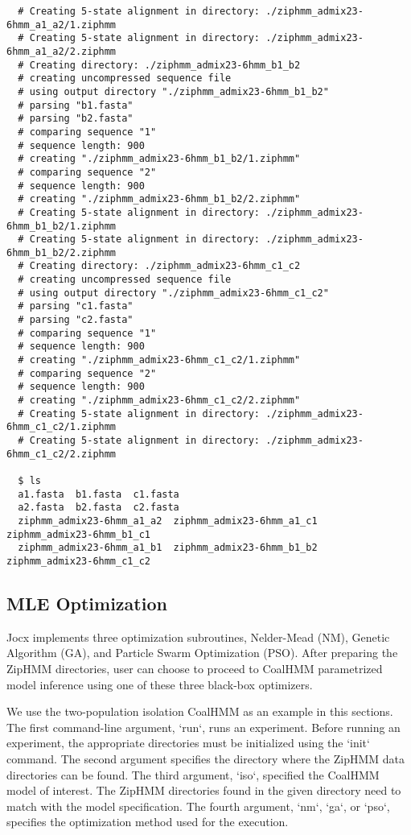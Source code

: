 {\begin{verbatim}
  # Creating 5-state alignment in directory: ./ziphmm_admix23-6hmm_a1_a2/1.ziphmm
  # Creating 5-state alignment in directory: ./ziphmm_admix23-6hmm_a1_a2/2.ziphmm
  # Creating directory: ./ziphmm_admix23-6hmm_b1_b2
  # creating uncompressed sequence file
  # using output directory "./ziphmm_admix23-6hmm_b1_b2"
  # parsing "b1.fasta"
  # parsing "b2.fasta"
  # comparing sequence "1"
  # sequence length: 900
  # creating "./ziphmm_admix23-6hmm_b1_b2/1.ziphmm"
  # comparing sequence "2"
  # sequence length: 900
  # creating "./ziphmm_admix23-6hmm_b1_b2/2.ziphmm"
  # Creating 5-state alignment in directory: ./ziphmm_admix23-6hmm_b1_b2/1.ziphmm
  # Creating 5-state alignment in directory: ./ziphmm_admix23-6hmm_b1_b2/2.ziphmm
  # Creating directory: ./ziphmm_admix23-6hmm_c1_c2
  # creating uncompressed sequence file
  # using output directory "./ziphmm_admix23-6hmm_c1_c2"
  # parsing "c1.fasta"
  # parsing "c2.fasta"
  # comparing sequence "1"
  # sequence length: 900
  # creating "./ziphmm_admix23-6hmm_c1_c2/1.ziphmm"
  # comparing sequence "2"
  # sequence length: 900
  # creating "./ziphmm_admix23-6hmm_c1_c2/2.ziphmm"
  # Creating 5-state alignment in directory: ./ziphmm_admix23-6hmm_c1_c2/1.ziphmm
  # Creating 5-state alignment in directory: ./ziphmm_admix23-6hmm_c1_c2/2.ziphmm

  $ ls
  a1.fasta  b1.fasta  c1.fasta
  a2.fasta  b2.fasta  c2.fasta
  ziphmm_admix23-6hmm_a1_a2  ziphmm_admix23-6hmm_a1_c1  ziphmm_admix23-6hmm_b1_c1
  ziphmm_admix23-6hmm_a1_b1  ziphmm_admix23-6hmm_b1_b2  ziphmm_admix23-6hmm_c1_c2
\end{verbatim}}

\subsection{MLE Optimization}

Jocx implements three optimization subroutines, Nelder-Mead (NM), Genetic
Algorithm (GA), and Particle Swarm Optimization (PSO). After preparing the
ZipHMM directories, user can choose to proceed to CoalHMM parametrized model
inference using one of these three black-box optimizers.

We use the two-population isolation CoalHMM as an example in this sections. The
first command-line argument, ‘run‘, runs an experiment. Before running an
experiment, the appropriate directories must be initialized using the ‘init‘
command. The second argument specifies the directory where the ZipHMM data
directories can be found. The third argument, ‘iso‘, specified the CoalHMM model
of interest. The ZipHMM directories found in the given directory need to match
with the model specification. The fourth argument, ‘nm‘, ‘ga‘, or ‘pso‘,
specifies the optimization method used for the execution.

